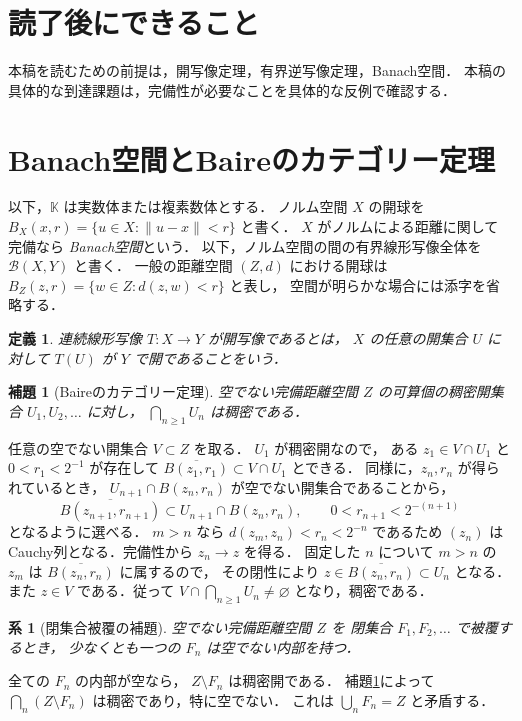 \documentclass[a5paper,10pt,onecolumn]{jsarticle}
\makeatletter
\theoremstyle{mathnotetheorem}
\newtheorem{definition}[theorem]{定義}
\newtheorem{lemma}[theorem]{補題}
\newtheorem{corollary}[theorem]{系}
\renewcommand{\proofname}{証明}
\renewenvironment{proof}[1][\proofname]{%
  \par\pushQED{\qed}\normalfont\topsep4\p@\@plus2\p@\relax
  \trivlist\item[\hskip\labelsep\bfseries #1]\ignorespaces
}{\popQED\endtrivlist\@endpefalse}
\makeatother
\begin{document}
\section*{読了後にできること}
本稿を読むための前提は，開写像定理，有界逆写像定理，Banach空間．
本稿の具体的な到達課題は，完備性が必要なことを具体的な反例で確認する．

\section{Banach空間とBaireのカテゴリー定理}

以下，$\mathbb K$ は実数体または複素数体とする．
ノルム空間 $X$ の開球を
$B_X(x,r)=\{u\in X:\|u-x\|<r\}$ と書く．
$X$ がノルムによる距離に関して完備なら
\emph{Banach空間}という．
以下，ノルム空間の間の有界線形写像全体を $\mathcal B(X,Y)$ と書く．
一般の距離空間 $(Z,d)$ における開球は
$B_Z(z,r)=\{w\in Z:d(z,w)<r\}$ と表し，
空間が明らかな場合には添字を省略する．

\begin{definition}
連続線形写像 $T:X\to Y$ が\emph{開写像}であるとは，
$X$ の任意の開集合 $U$ に対して
$T(U)$ が $Y$ で開であることをいう．
\end{definition}

\begin{lemma}[Baireのカテゴリー定理]\label{lem:baire}
空でない完備距離空間 $Z$ の可算個の稠密開集合
$U_1,U_2,\ldots$ に対し，
$\bigcap_{n\ge1}U_n$ は稠密である．
\end{lemma}
\begin{proof}
任意の空でない開集合 $V\subset Z$ を取る．
$U_1$ が稠密開なので，
ある $z_1\in V\cap U_1$ と $0<r_1<2^{-1}$ が存在して
$\overline{B(z_1,r_1)}\subset V\cap U_1$ とできる．
同様に，$z_n,r_n$ が得られているとき，
$U_{n+1}\cap B(z_n,r_n)$ が空でない開集合であることから，
\[
 \overline{B(z_{n+1},r_{n+1})}
 \subset U_{n+1}\cap B(z_n,r_n),\qquad
 0<r_{n+1}<2^{-(n+1)}
\]
となるように選べる．
$m>n$ なら $d(z_m,z_n)<r_n<2^{-n}$ であるため
$(z_n)$ はCauchy列となる．完備性から $z_n\to z$ を得る．
固定した $n$ について $m>n$ の $z_m$ は
$\overline{B(z_n,r_n)}$ に属するので，
その閉性により
$z\in\overline{B(z_n,r_n)}\subset U_n$ となる．
また $z\in V$ である．従って
$V\cap\bigcap_{n\ge1}U_n\ne\varnothing$ となり，稠密である．
\end{proof}

\begin{corollary}[閉集合被覆の補題]\label{cor:cover}
空でない完備距離空間 $Z$ を
閉集合 $F_1,F_2,\ldots$ で被覆するとき，
少なくとも一つの $F_n$ は空でない内部を持つ．
\end{corollary}
\begin{proof}
全ての $F_n$ の内部が空なら，
$Z\setminus F_n$ は稠密開である．
補題\ref{lem:baire}によって
$\bigcap_n(Z\setminus F_n)$ は稠密であり，特に空でない．
これは $\bigcup_nF_n=Z$ と矛盾する．
\end{proof}
\end{document}

